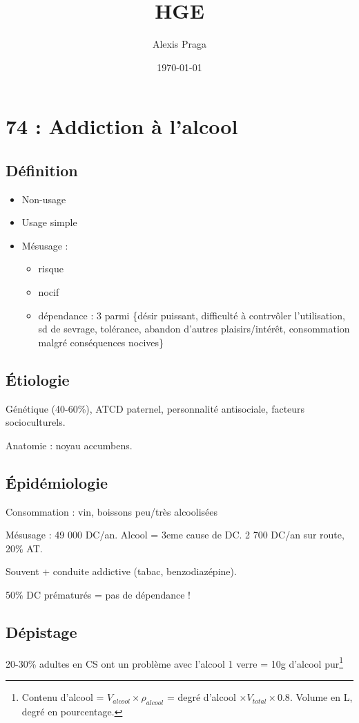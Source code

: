 \documentclass[11pt]{article}
\author{Alexis Praga}
\date{\today}
\title{HGE}
\begin{document}
\maketitle
\tableofcontents



\section{74 : Addiction à l'alcool}
\label{sec:org9f62e29}
\subsection{Définition}
\label{sec:org4ddba54}
\begin{itemize}
\item Non-usage
\item Usage simple
\item Mésusage : 
\begin{itemize}
\item risque
\item nocif
\item dépendance : 3 parmi \{désir puissant, difficulté à contrvôler l'utilisation,
sd de sevrage, tolérance, abandon d'autres plaisirs/intérêt, consommation
malgré conséquences nocives\}
\end{itemize}
\end{itemize}
\subsection{Étiologie}
\label{sec:orgac16204}
Génétique (40-60\%), ATCD paternel, personnalité antisociale, facteurs
socioculturels.

Anatomie : noyau accumbens.
\subsection{Épidémiologie}
\label{sec:org4badc67}
Consommation : \dec{} vin, \inc{} boissons peu/très alcoolisées

Mésusage : 49 000 DC/an. Alcool = 3eme cause de DC. 2 700 DC/an sur route, 20\%
AT.

Souvent + conduite addictive (tabac, benzodiazépine).

50\% DC prématurés = pas de dépendance !
\subsection{Dépistage}
\label{sec:org1f0def7}
20-30\% adultes en CS ont un problème avec l'alcool
1 verre = 10g d'alcool pur\footnote{Contenu d'alcool = \(V_{alcool} \times \rho_{alcool}\) = degré d'alcool
\(\times V_{total} \times 0.8\). Volume en L, degré en pourcentage.}
\end{document}
